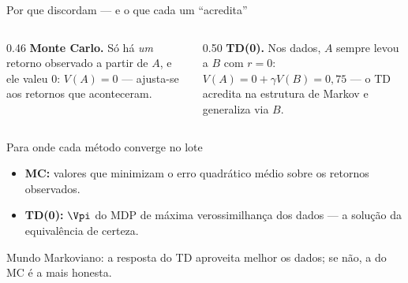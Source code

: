 \documentclass[aspectratio=169, 11pt]{beamer}
\begin{document}
\begin{frame}{Por que discordam — e o que cada um ``acredita''}
  \begin{columns}[T]
    \begin{column}{0.46\textwidth}
      \small\textbf{Monte Carlo.} Só há \emph{um} retorno observado a
      partir de $A$, e ele valeu $0$: $V(A) = 0$ — ajusta-se aos
      \alert{retornos que aconteceram}.
    \end{column}
    \begin{column}{0.50\textwidth}
      \small\textbf{TD(0).} Nos dados, $A$ sempre levou a $B$ com $r=0$:
      $V(A) = 0 + \gamma V(B) = 0{,}75$ — o TD \alert{acredita na
      estrutura de Markov} e generaliza via $B$.
    \end{column}
  \end{columns}

  \smallskip
  \begin{teobox}[fontupper=\small]{Para onde cada método converge no lote}
    \vspace{-0.2em}
    \begin{itemize}\setlength{\itemsep}{0.1ex}
      \item \textbf{MC:} valores que minimizam o erro quadrático médio
        sobre os retornos observados.
      \item \textbf{TD(0):} $\Vpi$ do MDP de máxima verossimilhança dos
        dados — a solução da \alert{equivalência de certeza}.
    \end{itemize}
  \end{teobox}

  \begin{ideiabox}
    Mundo Markoviano: a resposta do TD aproveita melhor os dados; se não,
    a do MC é a mais honesta.
  \end{ideiabox}
\end{frame}
\end{document}
